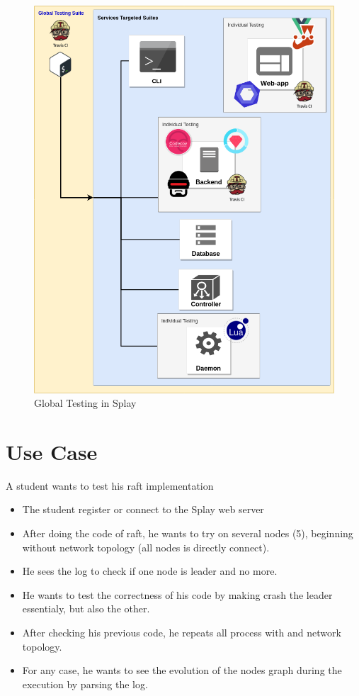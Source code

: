 \documentclass{eplmastersthesis}
\begin{document}
      \begin{figure}[H]
        \centering
        \includegraphics[scale=0.6]{figures/global_testing.png}
        \caption{\label{global_testing} Global Testing in Splay}
      \end{figure}

  \chapter{Use Case}
  A student wants to test his raft implementation
    \begin{itemize}
      \item The student register or connect to the Splay web server
      \item After doing the code of raft, he wants to try on several nodes (5),
      beginning without network topology (all nodes is directly connect).
      \item He sees the log to check if one node is leader and no more.
      \item He wants to test the correctness of his code by making crash the
      leader essentialy, but also the other.
      \item After checking his previous code, he repeats all process with and
      network topology.
      \item For any case, he wants to see the evolution of the nodes graph during the execution by parsing the log.
    \end{itemize}
\end{document}
